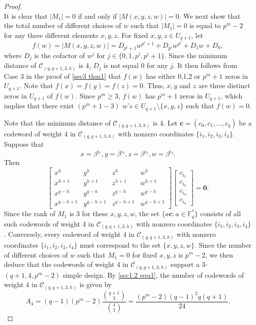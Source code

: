 \documentclass[sn-mathphys-num]{sn-jnl}%
\theoremstyle{thmstyleone}%
\theoremstyle{thmstyletwo}%
\theoremstyle{thmstylethree}%
\begin{document}
\begin{proof}
\begin{equation}
	\end{equation}
	It is clear that $|M_1|=0$ if and only if $|M(x,y,z,w)|=0$.	We next show that the total number of different choices of $w$ such that $|M_1|=0$ is equal to $p^m-2$ for any three different elements $x,y,z$. For fixed $x,y,z \in U_{q+1}$, let $$f(w)=|M(x,y,z,w)|=D_{p^i+1}w^{p^i+1}+D_{p^i}w^{p^i}+D_{1}w+D_{0},$$
	where $D_j$ is the cofactor of $w^j$ for $j \in \{0,1,p^i,p^i+1\}$. Since the minimum distance of $\mathcal{C}_{(q,q+1,3,h)}$ is 4, $D_j$ is not equal 0 for any $j$. It then follows from Case 3 in the proof of \cref{sec3 thm1} that $f(w)$ has either 0,1,2 or $p^{m} + 1$ zeros in $U_{q+1}$. Note that $f(x)=f(y)=f(z)=0$. Thus, $x,y$ and $z$ are three distinct zeros in $U_{q+1}$ of $f(w)$. Since $p^m\ge 3$, $f(w)$ has $p^{m} + 1$ zeros in $U_{q+1}$, which implies that there exist $(p^m+1-3)$ $w$’$s \in U_{q+1}\setminus\{x,y,z\}$ such that $f(w)=0$.
	
	Note that the minimum distance of $\mathcal{C}_{(q,q+1,3,h)}$ is 4. Let $\mathbf{c}=(c_0,c_1,\dots,c_q)$ be a codeword of weight 4 in $\mathcal{C}_{(q,q+1,3,h)}$ with nonzero coordinates $\{i_{1},i_{2},i_{3},i_{4}\}$. Suppose that
	\begin{equation*}
		x=\beta^{i_1}, y=\beta^{i_2}, z=\beta^{i_3}, w=\beta^{i_4}.
	\end{equation*}
	Then
	\begin{equation*}
		\left[\begin{array}{llll}x^{h}&y^{h}&z^{h}&w^{h}\\x^{h+1}&y^{h+1}&z^{h+1}&w^{h+1}\\x^{q-h}&y^{q-h}&z^{q-h}&w^{q-h}\\x^{q-h+1}&y^{q-h+1}&z^{q-h+1}&w^{q-h+1}\end{array}\right]\begin{bmatrix}c_{i_1}\\c_{i_2}\\c_{i_3}\\c_{i_4}\end{bmatrix}=\mathbf{0}.
	\end{equation*}
	Since the rank of $M_1$ is 3 for these $x,y,z,w$, the set $\{a\mathbf{c}:a\in \mathbb{F}_{q}^\ast\}$ consists of all such codewords of weight 4 in $\mathcal{C}_{(q,q+1,3,h)}$ with nonzero coordinates $\{i_{1},i_{2},i_{3},i_{4}\}$. Conversely, every codeword of weight 4 in $\mathcal{C}_{(q,q+1,3,h)}$ with nonzero coordinates $\{i_{1},i_{2},i_{3},i_{4}\}$ must correspond to the set $\{x,y,z,w\}$. Since the number of different choices of $w$ such that $M_1=0$ for fixed $x,y,z$ is $p^m-2$, we then deduce that the codewords of weight 4 in $\mathcal{C}_{(q,q+1,3,h)}$	support a $3$-$(q+1,4,p^m-2)$ simple design. By \cref{sec1.2 equ1}, the number of codewords of weight 4 in $\mathcal{C}_{(q,q+1,3,h)}$ is given by
	\begin{equation*}
		A_4=(q-1)(p^m-2)\frac{\binom{q+1}{3}}{\binom{4}{3}}=\frac{(p^m-2)(q-1)^2q(q+1)}{24}.
	\end{equation*}
	

\end{proof}
\end{document}
